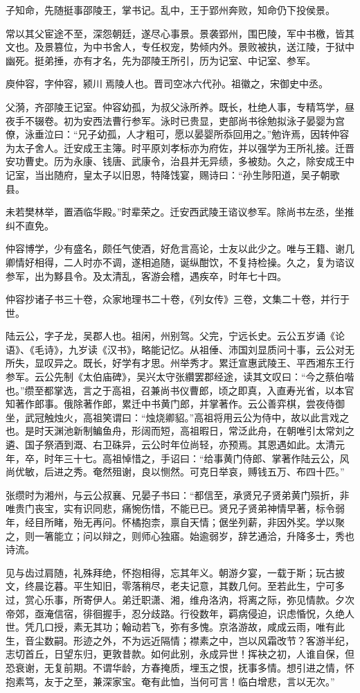 \documentclass[12pt,UTF8]{ctexbook}
\begin{document}
子知命，先随挺事邵陵王，掌书记。乱中，王于郢州奔败，知命仍下投侯景。

常以其父宦途不至，深怨朝廷，遂尽心事景。景袭郢州，围巴陵，军中书檄，皆其文也。及景篡位，为中书舍人，专任权宠，势倾内外。景败被执，送江陵，于狱中幽死。挺弟捶，亦有才名，先为邵陵王所引，历为记室、中记室、参军。

庾仲容，字仲容，颍川焉陵人也。晋司空冰六代孙。祖徽之，宋御史中丞。

父漪，齐邵陵王记室。仲容幼孤，为叔父泳所养。既长，杜绝人事，专精笃学，昼夜手不辍卷。初为安西法曹行参军。泳时已贵显，吏部尚书徐勉拟泳子晏婴为宫僚，泳垂泣曰：“兄子幼孤，人才粗可，愿以晏婴所忝回用之。”勉许焉，因转仲容为太子舍人。迁安成王主簿。时平原刘孝标亦为府佐，并以强学为王所礼接。迁晋安功曹史。历为永康、钱唐、武康令，治县并无异绩，多被劾。久之，除安成王中记室，当出随府，皇太子以旧恩，特降饯宴，赐诗曰：“孙生陟阳道，吴子朝歌县。

未若樊林举，置酒临华殿。”时辈荣之。迁安西武陵王谘议参军。除尚书左丞，坐推纠不直免。

仲容博学，少有盛名，颇任气使酒，好危言高论，士友以此少之。唯与王籍、谢几卿情好相得，二人时亦不调，遂相追随，诞纵酣饮，不复持检操。久之，复为谘议参军，出为黟县令。及太清乱，客游会稽，遇疾卒，时年七十四。

仲容抄诸子书三十卷，众家地理书二十卷，《列女传》三卷，文集二十卷，并行于世。

陆云公，字子龙，吴郡人也。祖闲，州别驾。父完，宁远长史。云公五岁诵《论语》、《毛诗》，九岁读《汉书》，略能记忆。从祖倕、沛国刘显质问十事，云公对无所失，显叹异之。既长，好学有才思。州举秀才。累迁宣惠武陵王、平西湘东王行参军。云公先制《太伯庙碑》，吴兴太守张纘罢郡经途，读其文叹曰：“今之蔡伯喈也。”缵至都掌选，言之于高祖，召兼尚书仪曹郎，顷之即真，入直寿光省，以本官知著作郎事。俄除著作郎，累迁中书黄门郎，并掌著作。云公善弈棋，尝夜侍御坐，武冠触烛火，高祖笑谓曰：“烛烧卿貂。”高祖将用云公为侍中，故以此言戏之也。是时天渊池新制鳊鱼舟，形阔而短，高祖暇日，常泛此舟，在朝唯引太常刘之遴、国子祭酒到溉、右卫硃异，云公时年位尚轻，亦预焉。其恩遇如此。太清元年，卒，时年三十七。高祖悼惜之，手诏曰：“给事黄门侍郎、掌著作陆云公，风尚优敏，后进之秀。奄然殂谢，良以恻然。可克日举哀，赙钱五万、布四十匹。”

张缵时为湘州，与云公叔襄、兄晏子书曰：“都信至，承贤兄子贤弟黄门殒折，非唯贵门丧宝，实有识同悲，痛惋伤惜，不能已已。贤兄子贤弟神情早著，标令弱年，经目所睹，殆无再问。怀橘抱柰，禀自天情；倨坐列薪，非因外奖。学以聚之，则一箸能立；问以辩之，则师心独寤。始逾弱岁，辞艺通洽，升降多士，秀也诗流。

见与齿过肩随，礼殊拜绝，怀抱相得，忘其年义。朝游夕宴，一载于斯；玩古披文，终晨讫暮。平生知旧，零落稍尽，老夫记意，其数几何。至若此生，宁可多过，赏心乐事，所寄伊人。弟迁职潇、湘，维舟洛汭，将离之际，弥见情款。夕次帝郊，亟淹信宿，徘徊握手，忍分歧路。行役数年，羁病侵迫，识虑惛怳，久绝人世。凭几口授，素无其功；翰动若飞，弥有多愧。京洛游故，咸成云雨，唯有此生，音尘数嗣。形迹之外，不为远近隔情；襟素之中，岂以风霜改节？客游半纪，志切首丘，日望东归，更敦昔款。如何此别，永成异世！挥袂之初，人谁自保，但恐衰谢，无复前期。不谓华龄，方春掩质，埋玉之恨，抚事多情。想引进之情，怀抱素笃，友于之至，兼深家宝。奄有此恤，当何可言！临白增悲，言以无次。”
\end{document}
